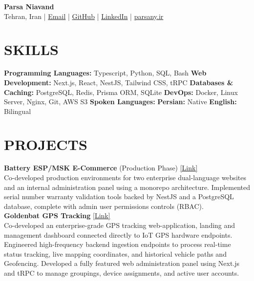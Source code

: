 \documentclass[a4paper,9pt]{extarticle}
\begin{document}
	
	\pagestyle{empty}
	
\begin{center}
	\textbf{\Huge Parsa Niavand }\\[6pt] %
	Tehran, Iran \quad | \quad \href{mailto:vvsparsa@gmail.com}{Email} \quad | \quad \href{https://www.github.com/parsany}{GitHub} \quad | \quad \href{https://www.linkedin.com/in/parsany}{LinkedIn} \quad | \quad \href{https://www.parsany.ir}{parsany.ir}
\end{center}
	
	
	\section*{SKILLS}
	
	\textbf{Programming Languages:}
	Typescript, Python, SQL, Bash
	\noindent
	\newline
	\textbf{Web Development:}
	Next.js, React, NestJS, Tailwind CSS, tRPC
	\noindent
	\newline
	\textbf{Databases \& Caching:}
	PostgreSQL, Redis, Prisma ORM, SQLite
	\noindent
	\newline
	\textbf{DevOps:}
	Docker, Linux Server, Nginx, Git, AWS S3
	\newline
	\textbf{Spoken Languages:}
	\textbf{Persian:} Native \;\; \textbf{English:} Bilingual
	

	
	
	\section*{PROJECTS}
	
	\noindent
	\textbf{Battery ESP/MSK E-Commerce} (Production Phase) \hfill \small{\href{https://parsany.ir/projects/esp}{[Link]}} \vspace*{2pt} \\
	Co-developed production environments for two enterprise dual-language websites and an internal administration panel using a monorepo architecture. Implemented serial number warranty validation tools backed by NestJS and a PostgreSQL database, complete with admin user permissions controls (RBAC).\vspace{6pt} \\

	\noindent
	\textbf{Goldenbat GPS Tracking} \hfill \small{\href{https://app.goldengps.ir}{[Link]}} \vspace*{2pt} \\
	Co-developed an enterprise-grade GPS tracking web-application, landing and management dashboard connected directly to IoT GPS hardware endpoints. Engineered high-frequency backend ingestion endpoints to process real-time status tracking, live mapping coordinates, and historical vehicle paths and Geofencing. Developed a fully featured web administration panel using Next.js and tRPC to manage groupings, device assignments, and active user accounts.\vspace{6pt} \\
\end{document}
